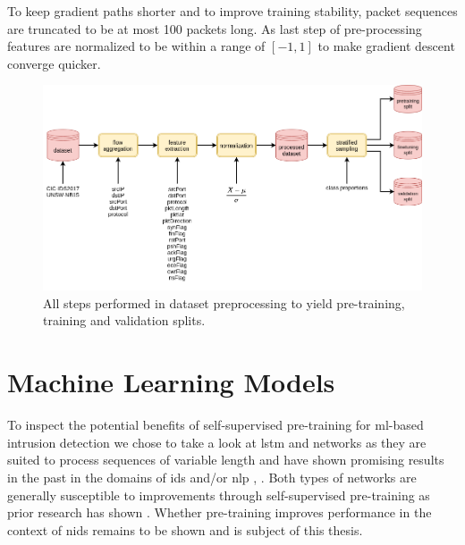 To keep gradient paths shorter and to improve training stability, packet sequences are truncated to be at most 100 packets long. As last step of pre-processing features are normalized to be within a range of $[-1,1]$ to make gradient descent converge quicker.

\begin{figure}[h]
	\centering
	\includegraphics[width=0.95\linewidth]{graphics/img/dataset_preprocessing.png}
	\caption{All steps performed in dataset preprocessing to yield pre-training, training and validation splits.}
	\label{fig:dataset_preprocessing}
\end{figure}

\section{Machine Learning Models}

To inspect the potential benefits of self-supervised pre-training for \gls{ml}-based intrusion detection we chose to take a look at \gls{lstm} and  networks as they are suited to process sequences of variable length and have shown promising results in the past in the domains of \gls{ids} and/or \gls{nlp} \cite{bert}, \cite{attention_model_ids}. Both types of networks are generally susceptible to improvements through self-supervised pre-training as prior research has shown \cite{bert} \cite{unsupervised_learning_lstms} \cite{unsupervised_learning_lstms_timeseries}. Whether pre-training improves performance in the context of \gls{nids} remains to be shown and is subject of this thesis.

